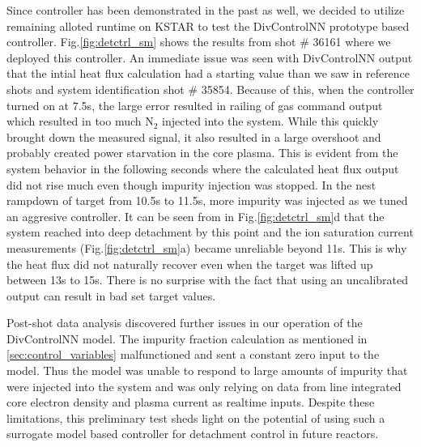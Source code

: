 Since \Afrac controller has been demonstrated in the past as well, we decided to utilize remaining alloted runtime on KSTAR to test the DivControlNN prototype based controller. Fig.\ref{fig:detctrl_sm} shows the results from shot \# 36161 where we deployed this controller. An immediate issue was seen with DivControlNN output that the intial heat flux calculation had a starting value than we saw in reference shots and system identification shot \# 35854. Because of this, when the controller turned on at 7.5s, the large error resulted in railing of gas command output which resulted in too much N$_2$ injected into the system. While this quickly brought down the measured signal, it also resulted in a large overshoot and probably created power starvation in the core plasma. This is evident from the system behavior in the following seconds where the calculated heat flux output did not rise much even though impurity injection was stopped. In the nest rampdown of target from 10.5s to 11.5s, more impurity was injected as we tuned an aggresive controller. It can be seen from \Afrac in Fig.\ref{fig:detctrl_sm}d that the system reached into deep detachment by this point and the ion saturation current measurements (Fig.\ref{fig:detctrl_sm}a) became unreliable beyond 11s. This is why the heat flux did not naturally recover even when the target was lifted up between 13s to 15s. There is no surprise with the fact that using an uncalibrated output can result in bad set target values.

Post-shot data analysis discovered further issues in our operation of the DivControlNN model. The impurity fraction calculation as mentioned in \ref{sec:control_variables} malfunctioned and sent a constant zero input to the model. Thus the model was unable to respond to large amounts of impurity that were injected into the system and was only relying on data from line integrated core electron density and plasma current as realtime inputs. Despite these limitations, this preliminary test sheds light on the potential of using such a surrogate model based controller for detachment control in future reactors.